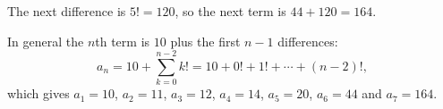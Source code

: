 The next difference is $5!=120$, so the next term is $44+120=\boxed{164}$.

In general the $n$th term is $10$ plus the first $n-1$ differences:
\[a_n=10+\sum_{k=0}^{n-2}k!=10+0!+1!+\cdots+(n-2)!,\]
which gives $a_1=10$, $a_2=11$, $a_3=12$, $a_4=14$, $a_5=20$, $a_6=44$ and $a_7=164$.
